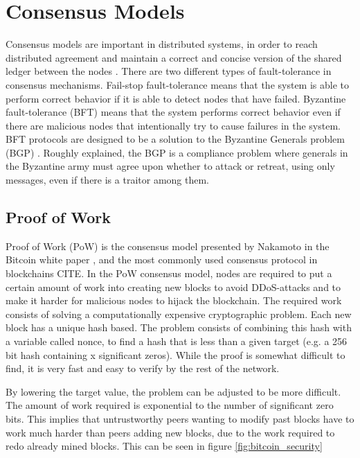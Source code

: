 \section{Consensus Models} 
Consensus models are important in distributed systems, in order to reach distributed agreement and maintain a correct and concise version of the shared ledger between the nodes \cite{Li_pos}. 
There are two different types of fault-tolerance in consensus mechanisms. Fail-stop fault-tolerance means that the system is able to perform correct behavior if it is able to detect nodes that have failed. Byzantine fault-tolerance (BFT) means that the system performs correct behavior even if there are malicious nodes that intentionally try to cause failures in the system. BFT protocols are designed to be a solution to the Byzantine Generals problem (BGP) \cite{byzantine_lamport}. Roughly explained, the BGP is a compliance problem where generals in the Byzantine army must agree upon whether to attack or retreat, using only messages, even if there is a traitor among them.


\subsection{Proof of Work}
Proof of Work (PoW) is the consensus model presented by Nakamoto in the Bitcoin white paper \cite{Nakamoto_bitcoin}, and the most commonly used consensus protocol in blockchains CITE. In the PoW consensus model, nodes are required to put a certain amount of work into creating new blocks to avoid DDoS-attacks and to make it harder for malicious nodes to hijack the blockchain. The required work consists of solving a computationally expensive cryptographic problem. Each new block has a unique hash based. The problem consists of combining this hash with a variable called nonce, to find a hash that is less than a given target (e.g. a 256 bit hash containing x significant zeros). While the proof is somewhat difficult to find, it is very fast and easy to verify by the rest of the network.

By lowering the target value, the problem can be adjusted to be more difficult. The amount of work required is exponential to the number of significant zero bits. This implies that untrustworthy peers wanting to modify past blocks have to work much harder than peers adding new blocks, due to the work required to redo already mined blocks. This can be seen in figure \ref{fig:bitcoin_security}

